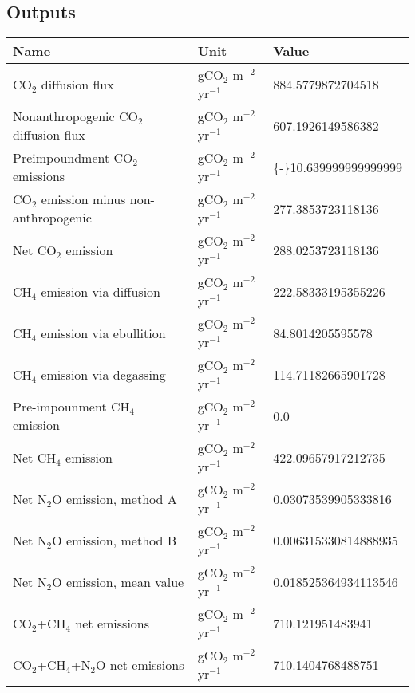 \documentclass{article}%
\begin{document}
%
\subsection{Outputs}%
\label{subsec:Outputs}%
\begin{center}%
\renewcommand{\arraystretch}{1.0}%
\begin{tabu}{@{}p{10cm} X[c] X[l]@{}}%
\toprule%
\textbf{Name}&\textbf{Unit}&\textbf{Value}\\%
\midrule%
CO$_2$ diffusion flux&gCO$_2$ m$^{-2}$ yr$^{-1}$&\num[round-precision=4,round-mode=figures]{884.5779872704518}\\%
Nonanthropogenic CO$_2$ diffusion flux&gCO$_2$ m$^{-2}$ yr$^{-1}$&\num[round-precision=4,round-mode=figures]{607.1926149586382}\\%
Preimpoundment CO$_2$ emissions&gCO$_2$ m$^{-2}$ yr$^{-1}$&\num[round-precision=4,round-mode=figures]{{-}10.639999999999999}\\%
CO$_2$ emission minus non-anthropogenic&gCO$_2$ m$^{-2}$ yr$^{-1}$&\num[round-precision=4,round-mode=figures]{277.3853723118136}\\%
Net CO$_2$ emission&gCO$_2$ m$^{-2}$ yr$^{-1}$&\num[round-precision=4,round-mode=figures]{288.0253723118136}\\%
CH$_4$ emission via diffusion&gCO$_2$ m$^{-2}$ yr$^{-1}$&\num[round-precision=4,round-mode=figures]{222.58333195355226}\\%
CH$_4$ emission via ebullition&gCO$_2$ m$^{-2}$ yr$^{-1}$&\num[round-precision=4,round-mode=figures]{84.8014205595578}\\%
CH$_4$ emission via degassing&gCO$_2$ m$^{-2}$ yr$^{-1}$&\num[round-precision=4,round-mode=figures]{114.71182665901728}\\%
Pre-impounment CH$_4$ emission&gCO$_2$ m$^{-2}$ yr$^{-1}$&\num[round-precision=4,round-mode=figures]{0.0}\\%
Net CH$_4$ emission&gCO$_2$ m$^{-2}$ yr$^{-1}$&\num[round-precision=4,round-mode=figures]{422.09657917212735}\\%
Net N$_2$O emission, method A&gCO$_2$ m$^{-2}$ yr$^{-1}$&\num[round-precision=4,round-mode=figures]{0.03073539905333816}\\%
Net N$_2$O emission, method B&gCO$_2$ m$^{-2}$ yr$^{-1}$&\num[round-precision=4,round-mode=figures]{0.006315330814888935}\\%
Net N$_2$O emission, mean value&gCO$_2$ m$^{-2}$ yr$^{-1}$&\num[round-precision=4,round-mode=figures]{0.018525364934113546}\\%
\midrule%
CO$_2$+CH$_4$ net emissions&gCO$_2$ m$^{-2}$ yr$^{-1}$&\num[round-precision=4,round-mode=figures]{710.121951483941}\\%
\midrule%
CO$_2$+CH$_4$+N$_2$O net emissions&gCO$_2$ m$^{-2}$ yr$^{-1}$&\num[round-precision=4,round-mode=figures]{710.1404768488751}\\\bottomrule%
%
\end{tabu}%
\end{center}%
\end{document}
